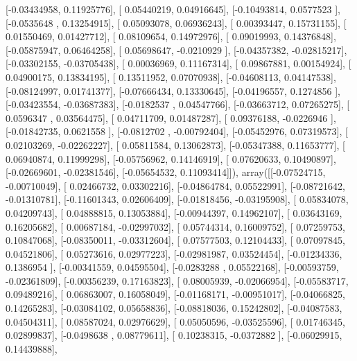 \documentclass{article}
\begin{document}
       [-0.03434958,  0.11925776],
       [ 0.05440219,  0.04916645],
       [-0.10493814,  0.0577523 ],
       [-0.0535648 ,  0.13254915],
       [ 0.05093078,  0.06936243],
       [ 0.00393447,  0.15731155],
       [ 0.01550469,  0.01427712],
       [ 0.08109654,  0.14972976],
       [ 0.09019993,  0.14376848],
       [-0.05875947,  0.06464258],
       [ 0.05698647, -0.0210929 ],
       [-0.04357382, -0.02815217],
       [-0.03302155, -0.03705438],
       [ 0.00036969,  0.11167314],
       [ 0.09867881,  0.00154924],
       [ 0.04900175,  0.13834195],
       [ 0.13511952,  0.07070938],
       [-0.04608113,  0.04147538],
       [-0.08124997,  0.01741377],
       [-0.07666434,  0.13330645],
       [-0.04196557,  0.1274856 ],
       [-0.03423554, -0.03687383],
       [-0.0182537 ,  0.04547766],
       [-0.03663712,  0.07265275],
       [ 0.0596347 ,  0.03564475],
       [ 0.04711709,  0.01487287],
       [ 0.09376188, -0.0226946 ],
       [-0.01842735,  0.0621558 ],
       [-0.0812702 , -0.00792404],
       [-0.05452976,  0.07319573],
       [ 0.02103269, -0.02262227],
       [ 0.05811584,  0.13062873],
       [-0.05347388,  0.11653777],
       [ 0.06940874,  0.11999298],
       [-0.05756962,  0.14146919],
       [ 0.07620633,  0.10490897],
       [-0.02669601, -0.02381546],
       [-0.05654532,  0.11093414]]), array([[-0.07524715, -0.00710049],
       [ 0.02466732,  0.03302216],
       [-0.04864784,  0.05522991],
       [-0.08721642, -0.01310781],
       [-0.11601343,  0.02606409],
       [-0.01818456, -0.03195908],
       [ 0.05834078,  0.04209743],
       [ 0.04888815,  0.13053884],
       [-0.00944397,  0.14962107],
       [ 0.03643169,  0.16205682],
       [ 0.00687184, -0.02997032],
       [ 0.05744314,  0.16009752],
       [ 0.07259753,  0.10847068],
       [-0.08350011, -0.03312604],
       [ 0.07577503,  0.12104433],
       [ 0.07097845,  0.04521806],
       [ 0.05273616,  0.02977223],
       [-0.02981987,  0.03524454],
       [-0.01234336,  0.1386954 ],
       [-0.00341559,  0.04595504],
       [-0.0283288 ,  0.05522168],
       [-0.00593759, -0.02361809],
       [-0.00356239,  0.17163823],
       [ 0.08005939, -0.02066954],
       [-0.05583717,  0.09489216],
       [ 0.06863007,  0.16058049],
       [-0.01168171, -0.00951017],
       [-0.04066825,  0.14265283],
       [-0.03084102,  0.05658836],
       [-0.08818036,  0.15242802],
       [-0.04087583,  0.04504311],
       [ 0.08587024,  0.02976629],
       [ 0.05050596, -0.03525596],
       [ 0.01746345,  0.02899837],
       [-0.0498638 ,  0.08779611],
       [ 0.10238315, -0.0372882 ],
       [-0.06029915,  0.14439888],
\end{document}

